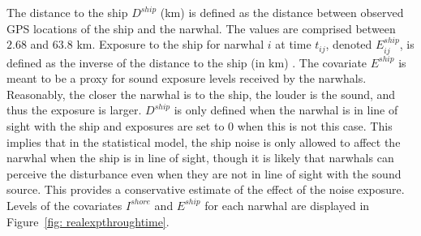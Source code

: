 \documentclass[aoas]{imsart}
\theoremstyle{definition}
\theoremstyle{remark}
\theoremstyle{remark}
\newcommand {\1}{\mathbb{1}}
\begin{document}
The distance to the ship $D^{ship}$ (km) is defined as the distance between observed GPS locations of the ship and the narwhal. The values are comprised between $2.68$ and $63.8$ km.
Exposure to the ship for narwhal $i$ at time $t_{ij}$, denoted $E^{ship}_{ij}$, is defined as the inverse of the distance to the ship (in km) \citep{heide-jorgensen_behavioral_2021}. The covariate $E^{ship}$ is meant to be a proxy for sound exposure levels received by the narwhals. Reasonably, the closer the narwhal is to the ship, the louder is the sound, and thus the exposure is larger. 
$D^{ship}$ is only defined when the narwhal is in line of sight with the ship and exposures are set to $0$ when this is not this case. This implies that in the statistical model, the ship noise is only allowed to affect the narwhal when the ship is in line of sight, though it is likely that narwhals can perceive the disturbance even when they are not in line of sight with the sound source. This provides a conservative estimate of the effect of the noise exposure. Levels of the covariates $I^{shore}$ and $E^{ship}$ for each narwhal are displayed in Figure~\ref{fig: realexpthroughtime}.
\end{document}
